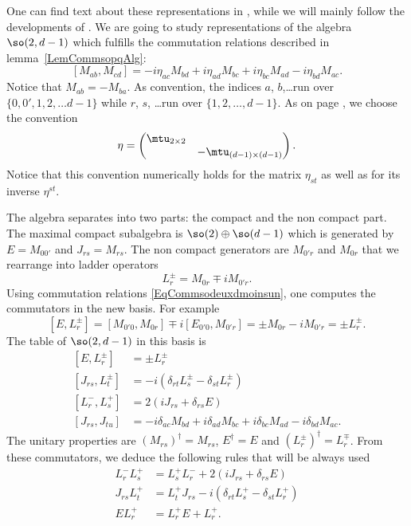 One can find text about these representations in \cite{Ferrata,Dolan_son,SingString}, while we will mainly follow the developments of \cite{SingletonCompposites,HowMassless,Teschner}. We are going to study representations of the algebra $\so(2,d-1)$ which fulfills the commutation relations described in lemma~\ref{LemCommsopqAlg}:
\begin{equation}		\label{EqCommsodeuxdmoinsun}
	[M_{ab},M_{cd}]=-i\eta_{ac}M_{bd}+i\eta_{ad}M_{bc}+i\eta_{bc}M_{ad}-i\eta_{bd}M_{ac}.
\end{equation}
Notice that $M_{ab}=-M_{ba}$. As convention, the indices $a$, $b$,\ldots run over $\{ 0,0',1,2,\ldots d-1 \}$ while $r$, $s$, \ldots run over $\{ 1,2,\ldots,d-1 \}$. As on page \pageref{PgDefsGenre}, we choose the convention
\begin{equation}
	\eta =
	\begin{pmatrix}
		\mtu_{2\times 2}\\
		&-\mtu_{(d-1)\times (d-1)}
	\end{pmatrix}.
\end{equation}
Notice that this convention numerically holds for the matrix $\eta_{st}$ as well as for its inverse $\eta^{st}$.

The algebra separates into two parts: the compact and the non compact part. The maximal compact subalgebra is $\so(2)\oplus\so(d-1)$ which is generated by $E=M_{00'}$ and $J_{rs}=M_{rs}$. The non compact generators are $M_{0'r}$ and $M_{0r}$ that we rearrange into ladder operators
\begin{equation}
	L^{\pm}_r=M_{0r}\mp iM_{0'r}.
\end{equation}
Using commutation relations \eqref{EqCommsodeuxdmoinsun}, one computes the commutators in the new basis. For example
\[
	[E,L^{\pm}_r]=[M_{0'0},M_{0r}]\mp i[E_{0'0},M_{0'r}]=\pm M_{0r}-iM_{0'r}=\pm L^{\pm}_r.
\]
The table of $\so(2,d-1)$ in this basis is
\begin{subequations}		\label{SubEqsCommssodeuxd}
	\begin{align}
		[E,L^{\pm}_r]&=\pm L^{\pm}_r\\
		[J_{rs},L_t^{\pm}]&=-i(\delta_{rt}L_s^{\pm}-\delta_{st}L_r^{\pm})\\
		[L_r^{-},L_s^+]&=2(iJ_{rs}+\delta_{rs}E)\\
		[J_{rs},J_{tu}]&=-i\delta_{ac}M_{bd}+i\delta_{ad}M_{bc}+i\delta_{bc}M_{ad}-i\delta_{bd}M_{ac}.
	\end{align}
\end{subequations}
The unitary properties are $(M_{rs})^{\dag}=M_{rs}$, $E^{\dag}=E$ and $(L^{\pm}_r)^{\dag}=L_r^{\mp}$. From these commutators, we deduce the following rules that will be always used
\begin{subequations}
	\begin{align}
		L^-_rL^+_s&=L^+_sL^-_r+2(iJ_{rs}+\delta_{rs}E)\\
		J_{rs}L^+_t&=L^+_tJ_{rs}-i(\delta_{rt}L^+_s-\delta_{st}L^+_r)\\
		EL^+_r&=L^+_rE+L^+_r.
	\end{align}
\end{subequations}

